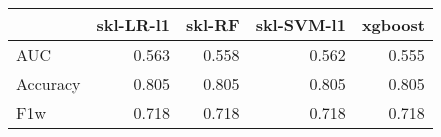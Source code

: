 \begin{tabular}{lrrrr}
\toprule
{} &  skl-LR-l1 &  skl-RF &  skl-SVM-l1 &  xgboost \\
\midrule
AUC      &      0.563 &   0.558 &       0.562 &    0.555 \\
Accuracy &      0.805 &   0.805 &       0.805 &    0.805 \\
F1w      &      0.718 &   0.718 &       0.718 &    0.718 \\
\bottomrule
\end{tabular}
